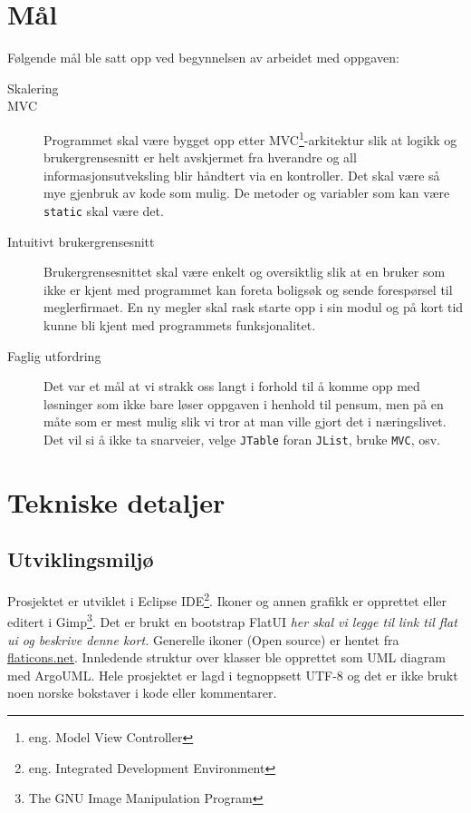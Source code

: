 \section{Mål}
Følgende mål ble satt opp ved begynnelsen av arbeidet med oppgaven:
\begin{description}
\item[Skalering]

\item[MVC]
Programmet skal være bygget opp etter MVC\footnote{eng. Model View Controller}-arkitektur slik at logikk og brukergrensesnitt er helt avskjermet fra hverandre og all informasjonsutveksling blir håndtert via en kontroller. Det skal være så mye gjenbruk av kode som mulig. De metoder og variabler som kan være \texttt{static} skal være det.
\item[Intuitivt brukergrensesnitt]
Brukergrensesnittet skal være enkelt og oversiktlig slik at en bruker som ikke er kjent med programmet kan foreta boligsøk og sende forespørsel til meglerfirmaet. En ny megler skal rask starte opp i sin modul og på kort tid kunne bli kjent med programmets funksjonalitet.
\item[Faglig utfordring]
Det var et mål at vi strakk oss langt i forhold til å komme opp med løsninger som ikke bare løser oppgaven i henhold til pensum, men på en måte som er mest mulig slik vi tror at man ville gjort det i næringslivet. Det vil si å ikke ta snarveier, velge \texttt{JTable} foran \texttt{JList}, bruke \texttt{MVC}, osv.
\end{description}

\section{Tekniske detaljer}

\subsection{Utviklingsmiljø} \label{subssec:utvmiljo}
Prosjektet er utviklet i Eclipse IDE\footnote{eng. Integrated Development
Environment}. Ikoner og annen grafikk er opprettet eller editert i Gimp\footnote{The GNU Image Manipulation Program}.
Det er brukt en bootstrap FlatUI \emph{her skal vi legge til link til flat ui
og beskrive denne kort.} Generelle ikoner (Open source) er hentet fra
\href{http://www.flaticons.net}{flaticons.net}. Innledende struktur over klasser ble opprettet som UML diagram med ArgoUML.
Hele prosjektet er lagd i tegnoppsett UTF-8 og det er ikke brukt noen norske bokstaver i kode eller kommentarer.

